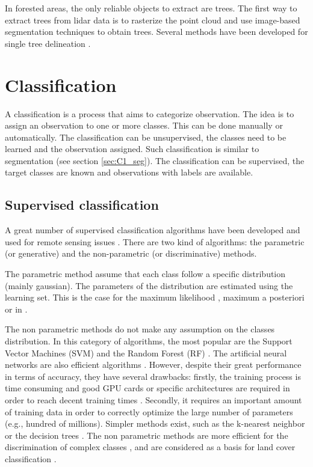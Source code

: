In forested areas, the only reliable objects to extract are trees. The first way to extract trees from lidar data is to rasterize the point cloud and use image-based segmentation techniques to obtain trees. Several methods have been developed for single tree delineation \citep{dalponte2014tree, vega2014ptrees, kandare2014new}. 

\section{Classification}
A classification is a process that aims to categorize observation. The idea is to assign an observation to one or more classes. This can be done manually or automatically. The classification can be unsupervised, the classes need to be learned and the observation assigned. Such classification is similar to segmentation (see section \ref{sec:C1_seg}). The classification can be supervised, the target classes are known and observations with labels are available.

\subsection{Supervised classification}
A great number of supervised classification algorithms have been developed and used for remote sensing issues \citep{landgrebe2005signal, lu2007survey, mather2016classification}. There are two kind of algorithms: the parametric (or generative) and the non-parametric (or discriminative) methods.

The parametric method assume that each class follow a specific distribution (mainly gaussian). The parameters of the distribution are estimated using the learning set. This is the case for the maximum likelihood \citep{strahler1980use}, maximum a posteriori \citep{fauvel2015fast} or in \cite{trias2005high}.

The non parametric methods do not make any assumption on the classes distribution. In this category of algorithms, the most popular are the Support Vector Machines (SVM) \citep{boser1992training, scholkopf2001learning} and the Random Forest (RF) \citep{breiman2001random}. The artificial neural networks are also efficient algorithms \citep{hepner1990artificial, atkinson1997mapping}. However, despite their great performance in terms of accuracy, they have several drawbacks: firstly, the training process is time consuming and good GPU cards or specific architectures are required in order to reach decent training times \citep{dean2012large, moritz2015sparknet}. Secondly, it requires an important amount of training data in order to correctly optimize the large number of parameters (e.g., hundred of millions). Simpler methods exist, such as the k-nearest neighbor \citep{indyk1998approximate} or the decision trees \citep{breiman1984classification}. The non parametric methods are more efficient  for the discrimination of complex classes \citep{paola1995review, foody2002status}, and are considered as a basis for land cover classification \citep{camps2009kernel}.

